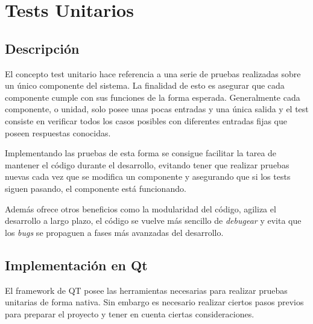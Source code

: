 
\pagestyle{fancy}
\fancyhead[LE,RO]{\thepage}
\fancyhead[LO]{\nouppercase{\rightmark}}

\chapter{Tests Unitarios}

\minitoc

\section{Descripción}

El concepto test unitario hace referencia a una serie de pruebas realizadas sobre un único componente del sistema. La finalidad de esto es asegurar que cada componente cumple con sus funciones de la forma esperada. Generalmente cada componente, o unidad, solo posee unas pocas entradas y una única salida y el test consiste en verificar todos los casos posibles con diferentes entradas fijas que poseen respuestas conocidas.

Implementando las pruebas de esta forma se consigue facilitar la tarea de mantener el código durante el desarrollo, evitando tener que realizar pruebas nuevas cada vez que se modifica un componente y asegurando que si los tests siguen pasando, el componente está funcionando.

Además ofrece otros beneficios como la modularidad del código, agiliza el desarrollo a largo plazo, el código se vuelve más sencillo de \textit{debugear} y evita que los \textit{bugs} se propaguen a fases más avanzadas del desarrollo.

\section{Implementación en Qt}

El framework de QT posee las herramientas necesarias para realizar pruebas unitarias de forma nativa. Sin embargo es necesario realizar ciertos pasos previos para preparar el proyecto y tener en cuenta ciertas consideraciones.

